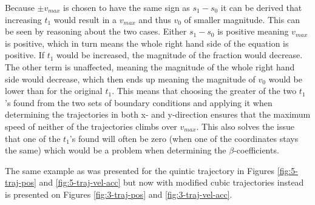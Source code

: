 Because $\pm v_{max}$ is chosen to have the same sign as $s_1-s_0$ it can be derived that increasing $t_1$ would result in a $v_{max}$ and thus $v_0$ of smaller magnitude. This can be seen by reasoning about the two cases. Either $s_1-s_0$ is positive meaning $v_{max}$ is positive, which in turn means the whole right hand side of the equation is positive. If $t_1$ would be increased, the magnitude of the fraction would decrease. The other term is unaffected, meaning the magnitude of the whole right hand side would decrease, which then ends up meaning the magnitude of $v_0$ would be lower than for the original $t_1$. This means that choosing the greater of the two $t_1$'s found from the two sets of boundary conditions and applying it when determining the trajectories in both x- and y-direction ensures that the maximum speed of neither of the trajectories climbs over $v_{max}$. This also solves the issue that one of the $t_1$'s found will often be zero (when one of the coordinates stays the same) which would be a problem when determining the $\beta$-coefficients.

The same example as was presented for the quintic trajectory in Figures \ref{fig:5-traj-pos} and \ref{fig:5-traj-vel-acc} but now with modified cubic trajectories instead is presented on Figures \ref{fig:3-traj-pos} and \ref{fig:3-traj-vel-acc}.

